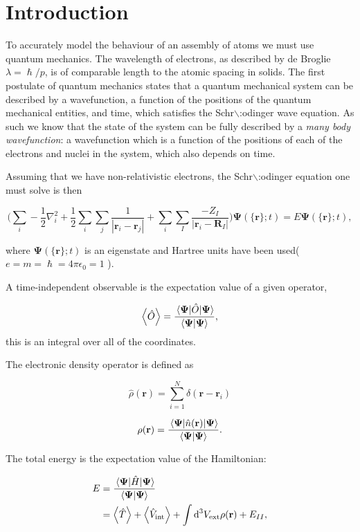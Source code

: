 \documentclass[a4paper,12pt,oneside,print,numbered,index,PageStyleIII]{PhDThesisPSnPDF}
\begin{document}
\section{Introduction}
\label{sec:org92b6ab2}

To accurately model the behaviour of an assembly of atoms we must use quantum mechanics. The
wavelength of electrons, as described by de Broglie \(\lambda = \hslash/p\), is of comparable length
to the atomic spacing in solids. The first postulate of quantum mechanics states that a quantum
mechanical system can be described by a wavefunction, a function of the positions of the quantum
mechanical entities, and time, which satisfies the Schr$\backslash$:odinger wave equation. As such we know that
the state of the system can be fully described by a \emph{many body wavefunction}: a wavefunction which
is a function of the positions of each of the electrons and nuclei in the system, which also depends
on time.

Assuming that we have non-relativistic electrons, the Schr$\backslash$:odinger equation one must solve is then

  \begin{equation}
    \Big( \sum_{i} - \frac{1}{2} \nabla_{i}^{2} + \frac{1}{2} \sum_i \sum_j    \frac{1}{|
\mathbf{r}_i - \mathbf{r}_j |}+ \sum_i \sum_I \frac{-Z_I}{| \mathbf{r}_i - \mathbf{R}_I |} \Big)
\mathbf{ \Psi }(\{\mathbf{r}\}; t) = E \mathbf{ \Psi }(\{\mathbf{r}\}; t),
    \label{eq:non_rel_schodinger}
  \end{equation}

where \(\mathbf{ \Psi }(\{\mathbf{r}\}; t)\) is an eigenstate and Hartree units have been used( \(e = m = \hslash = 4\pi\epsilon_0 = 1\) ).

A time-independent observable is the expectation value of a given operator,

\[ \expval{\hat{O}} = \frac{\expval{\hat{O}}{\mathbf{ \Psi }} }{ \bra{\mathbf{ \Psi}}\ket{\mathbf{ \Psi }} }, \]
this is an integral over all of the coordinates.

The electronic density operator is defined as

\[ \hat{\rho}(\mathbf{r}) = \sum_{i=1}^{N} \delta ( \mathbf{r} - \mathbf{r}_{i} ) \]

\[ \rho(\mathbf{r}) = \frac{\expval{\hat{n}(\mathbf{r})}{\mathbf{ \Psi }} }{ \bra{\mathbf{\Psi}}\ket{\mathbf{ \Psi }} }. \]

The total energy is the expectation value of the Hamiltonian:

\begin{align}
 E &= \frac{\expval{\hat{H}}{\mathbf{ \Psi }} }{ \bra{\mathbf{\Psi}}\ket{\mathbf{ \Psi }}}\\
   &= \expval{\hat{T}} + \expval{\hat{V}_{\text{int}}} + \int \text{d}^3 V_{\text{ext}} \rho(\mathbf{r}) + E_{II},
\label{eq:totalenergy}
\end{align}
\end{document}
